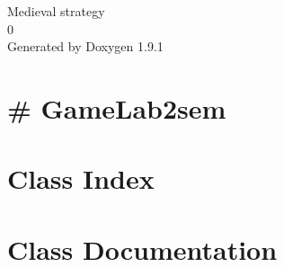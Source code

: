 \let\mypdfximage\pdfximage\def\pdfximage{\immediate\mypdfximage}\documentclass[twoside]{book}
\newcommand{\+}{\discretionary{\mbox{\scriptsize$\hookleftarrow$}}{}{}}
\newcommand{\clearemptydoublepage}{%
  \newpage{\pagestyle{empty}\cleardoublepage}%
}
\begin{document}
\raggedbottom

\hypersetup{pageanchor=false,
             bookmarksnumbered=true,
             pdfencoding=unicode
            }
\begin{titlepage}
\vspace*{7cm}
\begin{center}%
{\Large Medieval strategy \\[1ex]\large 0 }\\
\vspace*{1cm}
{\large Generated by Doxygen 1.9.1}\\
\end{center}
\end{titlepage}
\clearemptydoublepage
{}
\tableofcontents
\clearemptydoublepage
{}
\hypersetup{pageanchor=true}

\chapter{\# Game\+Lab2sem}
\label{index}\hypertarget{index}{}
\chapter{Class Index}

\chapter{Class Documentation}




\backmatter
\newpage
{}
\clearemptydoublepage
{}
\printindex
\end{document}
